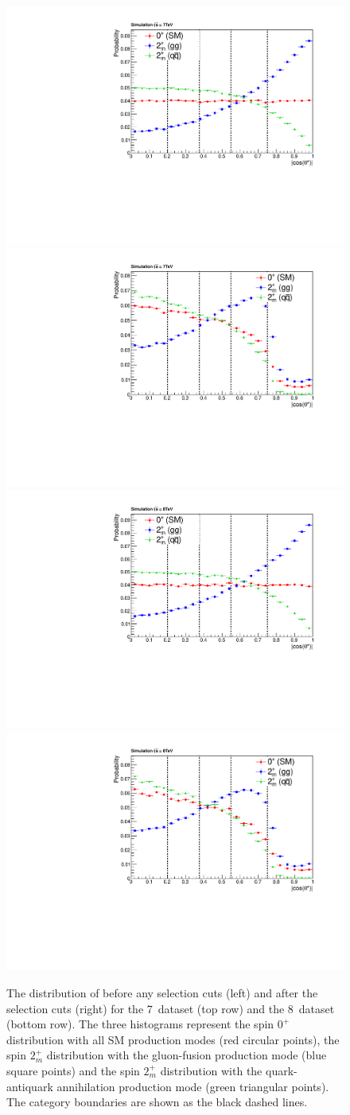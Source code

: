 \begin{figure}
	\begin{center}
	\includegraphics[width=0.49\linewidth]{analysis/plots/spin/before_7TeV.pdf}
	\includegraphics[width=0.49\linewidth]{analysis/plots/spin/after_7TeV.pdf} \\
	\includegraphics[width=0.49\linewidth]{analysis/plots/spin/before_8TeV.pdf}
	\includegraphics[width=0.49\linewidth]{analysis/plots/spin/after_8TeV.pdf} \\
	\caption[The distribution of \abscostheta before and after selection cuts for different spin signals]{The distribution of \abscostheta before any selection cuts (left) and after the selection cuts (right) for the 7~\TeV dataset (top row) and the 8~\TeV dataset (bottom row). The three histograms represent the spin $0^+$ distribution with all SM production modes (red circular points), the spin $2^+_m$ distribution with the gluon-fusion production mode (blue square points) and the spin $2^+_m$ distribution with the quark-antiquark annihilation production mode (green triangular points). The \abscostheta category boundaries are shown as the black dashed lines.}
	\label{fig:acc_cuts}
	\end{center}
\end{figure}	

